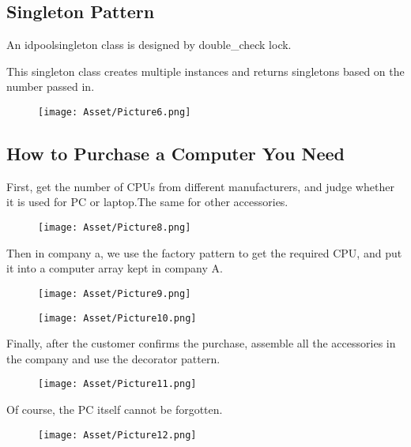 \documentclass{article}
\begin{document}
\subsection{Singleton Pattern}
    An idpoolsingleton class is designed by double\_check lock.
    
    This singleton class creates multiple instances and returns singletons based on the number passed in.
    
\begin{figure}
\centering
\texttt{[image: Asset/Picture6.png]}
\end{figure}    
    
\subsection{How to Purchase a Computer You Need}
    First, get the number of CPUs from different manufacturers, and judge whether it is used for PC or laptop.The same for other accessories.
    
\begin{figure}
\centering
\texttt{[image: Asset/Picture8.png]}
\end{figure}    
    
    Then in company a, we use the factory pattern to get the required CPU, and put it into a computer array kept in company A.
    
\begin{figure}
\centering
\texttt{[image: Asset/Picture9.png]}
\end{figure}  

\begin{figure}
\centering
\texttt{[image: Asset/Picture10.png]}
\end{figure}    
    
    Finally, after the customer confirms the purchase, assemble all the accessories
in the company and use the decorator pattern.

\begin{figure}
\centering
\texttt{[image: Asset/Picture11.png]}
\end{figure}    
    
    Of course, the PC itself cannot be forgotten.
    
\begin{figure}
\centering
\texttt{[image: Asset/Picture12.png]}
\end{figure}    
    
\end{document}
